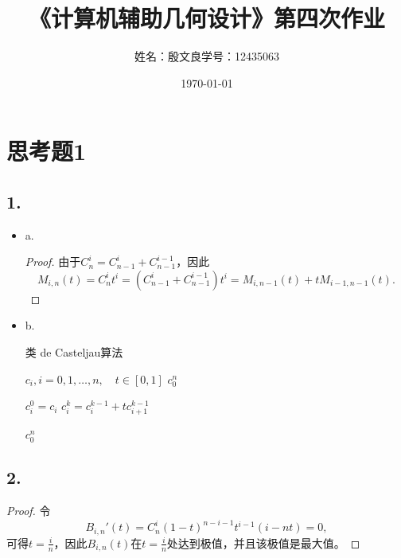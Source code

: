 \documentclass[utf8]{ctexart}
\title{《计算机辅助几何设计》第四次作业}
\author{姓名：殷文良\qquad 学号：12435063}
\date{\today}
\begin{document}
\maketitle
{}

\section*{思考题1}
\subsection*{1.}
\begin{itemize}
    \item a.
    \begin{proof}
        由于$C_n^i = C_{n-1}^i + C_{n-1}^{i-1}$，因此
        \begin{equation*}
            M_{i,n}(t) = C_n^it^i
            = (C_{n-1}^i + C_{n-1}^{i-1})t^i
            = M_{i,n-1}(t) + tM_{i-1,n-1}(t).
        \end{equation*}
    \end{proof}
    \item b.
    \begin{algorithm}
        \caption{类 de Casteljau算法}
        \label{alg1}
        \renewcommand{\algorithmicrequire}{\textbf{Input:}}
        \renewcommand{\algorithmicensure}{\textbf{Output:}}
        \begin{algorithmic}[1]
            \REQUIRE $c_i,i=0,1,\dots,n,\quad t\in[0,1]$
            \ENSURE $c_0^n$

            \STATE $c_i^0=c_i$
            \ENDFOR
            \STATE $c_i^k = c_{i}^{k-1} + tc_{i+1}^{k-1}$
            \ENDFOR
            \ENDFOR

            \RETURN $c_0^n$
        \end{algorithmic}
    \end{algorithm}
\end{itemize}

\subsection*{2.}
\begin{proof}
    令
    \begin{equation*}
        B_{i,n}'(t) = C_n^i(1-t)^{n-i-1}t^{i-1}(i-nt) = 0,
    \end{equation*}
    可得$t=\frac{i}{n}$，因此$B_{i,n}(t)$在$t=\frac{i}{n}$处达到极值，并且该极值是最大值。
\end{proof}
\end{document}
